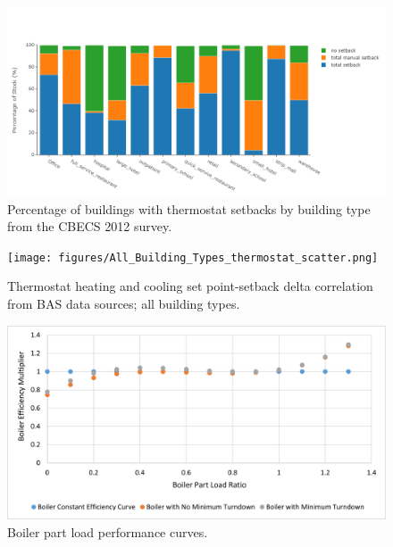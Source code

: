 \begin{figure}
    \centering \includegraphics[width=1.0\textwidth]{figures/cbecs_therm_summary.png}
    \caption[Percentage of buildings with thermostat setbacks from the CBECS 2012 survey]{Percentage of buildings with thermostat setbacks by building type from the CBECS 2012 survey.}
    \label{fig:cbecs_therm_setback_summary}
\end{figure}

\begin{figure}
    \centering \texttt{[image: figures/All\_Building\_Types\_thermostat\_scatter.png]}
    \caption[Correlation between thermostat set point and thermostat setback from BAS data]{Thermostat heating and cooling set point-setback delta correlation from BAS data sources; all building types.}
    \label{fig:therm_setpoint_setback}
\end{figure}

\pagebreak

\begin{figure}
    \centering \includegraphics[width=1.0\textwidth]{figures/boiler_performance_curves.png}
    \caption[Boiler part load performance curves]{Boiler part load performance curves.}
    \label{fig:blr_plr_curves}
\end{figure}


